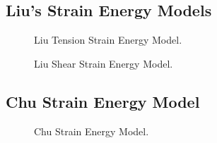 \documentclass{article}
\begin{document}
\subsection{Liu’s Strain Energy Models}

\begin{figure}[!htp]
\caption{Liu Tension Strain Energy Model.}
\label{Fig:NF-NP-TGMF-Liu1}
\end{figure}

\begin{figure}[!htp]
\caption{Liu Shear Strain Energy Model.}
\label{Fig:NF-NP-TGMF-Liu2}
\end{figure}

\subsection{Chu Strain Energy Model}
\begin{figure}[!htp]
\caption{Chu Strain Energy Model.}
\label{Fig:NF-NP-TGMF-Chu}
\end{figure}


\end{document}
